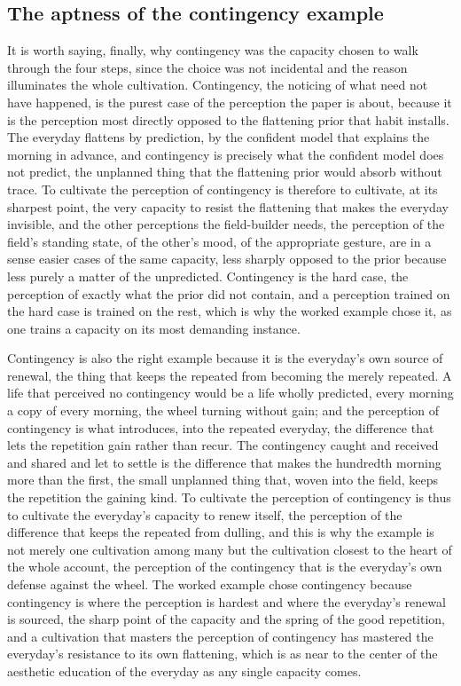 \subsection{The aptness of the contingency example}
\label{p22:sub:we-why-contingency}

It is worth saying, finally, why contingency was the capacity chosen to walk through the four steps, since the choice was not incidental and the reason illuminates the whole cultivation. Contingency, the noticing of what need not have happened, is the purest case of the perception the paper is about, because it is the perception most directly opposed to the flattening prior that habit installs. The everyday flattens by prediction, by the confident model that explains the morning in advance, and contingency is precisely what the confident model does not predict, the unplanned thing that the flattening prior would absorb without trace. To cultivate the perception of contingency is therefore to cultivate, at its sharpest point, the very capacity to resist the flattening that makes the everyday invisible, and the other perceptions the field-builder needs, the perception of the field's standing state, of the other's mood, of the appropriate gesture, are in a sense easier cases of the same capacity, less sharply opposed to the prior because less purely a matter of the unpredicted. Contingency is the hard case, the perception of exactly what the prior did not contain, and a perception trained on the hard case is trained on the rest, which is why the worked example chose it, as one trains a capacity on its most demanding instance.

Contingency is also the right example because it is the everyday's own source of renewal, the thing that keeps the repeated from becoming the merely repeated. A life that perceived no contingency would be a life wholly predicted, every morning a copy of every morning, the wheel turning without gain; and the perception of contingency is what introduces, into the repeated everyday, the difference that lets the repetition gain rather than recur. The contingency caught and received and shared and let to settle is the difference that makes the hundredth morning more than the first, the small unplanned thing that, woven into the field, keeps the repetition the gaining kind. To cultivate the perception of contingency is thus to cultivate the everyday's capacity to renew itself, the perception of the difference that keeps the repeated from dulling, and this is why the example is not merely one cultivation among many but the cultivation closest to the heart of the whole account, the perception of the contingency that is the everyday's own defense against the wheel. The worked example chose contingency because contingency is where the perception is hardest and where the everyday's renewal is sourced, the sharp point of the capacity and the spring of the good repetition, and a cultivation that masters the perception of contingency has mastered the everyday's resistance to its own flattening, which is as near to the center of the aesthetic education of the everyday as any single capacity comes.
